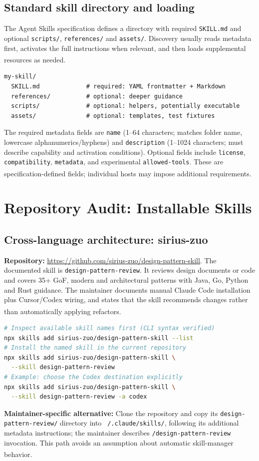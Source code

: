 \documentclass[11pt,letterpaper]{article}
\newcommand{\src}[1]{\textsuperscript{\textcolor{teal}{\cite{#1}}}}
\begin{document}
\subsection{Standard skill directory and loading}
The Agent Skills specification defines a directory with required \texttt{SKILL.md} and optional \texttt{scripts/}, \texttt{references/} and \texttt{assets/}. Discovery usually reads metadata first, activates the full instructions when relevant, and then loads supplemental resources as needed.\src{spec,spechome}
\begin{lstlisting}[style=textstyle]
my-skill/
  SKILL.md             # required: YAML frontmatter + Markdown
  references/          # optional: deeper guidance
  scripts/             # optional: helpers, potentially executable
  assets/              # optional: templates, test fixtures
\end{lstlisting}
The required metadata fields are \texttt{name} (1--64 characters; matches folder name, lowercase alphanumerics/hyphens) and \texttt{description} (1--1024 characters; must describe capability and activation conditions). Optional fields include \texttt{license}, \texttt{compatibility}, \texttt{metadata}, and experimental \texttt{allowed-tools}. These are specification-defined fields; individual hosts may impose additional requirements.\src{spec}

\section{Repository Audit: Installable Skills}
\subsection{Cross-language architecture: sirius-zuo}
\textbf{Repository:} \url{https://github.com/sirius-zuo/design-pattern-skill}. The documented skill is \texttt{design-pattern-review}. It reviews design documents or code and covers 35+ GoF, modern and architectural patterns with Java, Go, Python and Rust guidance. The maintainer documents manual Claude Code installation plus Cursor/Codex wiring, and states that the skill recommends changes rather than automatically applying refactors.\src{sirius}
\begin{lstlisting}[language=bash]
# Inspect available skill names first (CLI syntax verified)
npx skills add sirius-zuo/design-pattern-skill --list
# Install the named skill in the current repository
npx skills add sirius-zuo/design-pattern-skill \
  --skill design-pattern-review
# Example: choose the Codex destination explicitly
npx skills add sirius-zuo/design-pattern-skill \
  --skill design-pattern-review -a codex
\end{lstlisting}
\textbf{Maintainer-specific alternative:} Clone the repository and copy its \texttt{design-pattern-review/} directory into \texttt{\string~/.claude/skills/}, following its additional metadata instructions; the maintainer describes \texttt{/design-pattern-review} invocation. This path avoids an assumption about automatic skill-manager behavior.\src{sirius}
\end{document}
